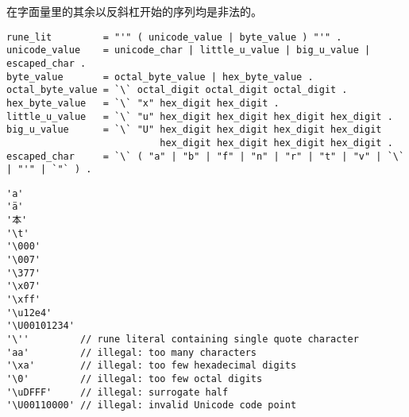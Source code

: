 在\rune{}字面量里的其余以反斜杠开始的序列均是非法的。
\begin{lstlisting}[style=EBNF]
rune_lit         = "'" ( unicode_value | byte_value ) "'" .
unicode_value    = unicode_char | little_u_value | big_u_value | escaped_char .
byte_value       = octal_byte_value | hex_byte_value .
octal_byte_value = `\` octal_digit octal_digit octal_digit .
hex_byte_value   = `\` "x" hex_digit hex_digit .
little_u_value   = `\` "u" hex_digit hex_digit hex_digit hex_digit .
big_u_value      = `\` "U" hex_digit hex_digit hex_digit hex_digit
                           hex_digit hex_digit hex_digit hex_digit .
escaped_char     = `\` ( "a" | "b" | "f" | "n" | "r" | "t" | "v" | `\` | "'" | `"` ) .
\end{lstlisting}

\begin{lstlisting}[style=golang]
'a'
'ä'
'本'
'\t'
'\000'
'\007'
'\377'
'\x07'
'\xff'
'\u12e4'
'\U00101234'
'\''         // rune literal containing single quote character
'aa'         // illegal: too many characters
'\xa'        // illegal: too few hexadecimal digits
'\0'         // illegal: too few octal digits
'\uDFFF'     // illegal: surrogate half
'\U00110000' // illegal: invalid Unicode code point
\end{lstlisting}